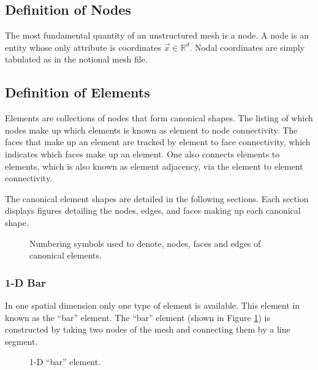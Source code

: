 \documentclass[letterpaper]{article}
\newcommand{\figref}[1]{Figure \ref{#1}}                %
\begin{document}
\subsection{Definition of Nodes}
The most fundamental quantity of an unstructured mesh is a node.  A node is an entity whose only attribute is coordinates $\vec{x} \in \mathbb{R}^{d}$.  Nodal coordinates are simply tabulated as in the notional mesh file.  
\subsection{Definition of Elements}
Elements are collections of nodes that form canonical shapes.  The listing of which nodes make up which elements is known as element to node connectivity.  The faces that make up an element are tracked by element to face connectivity, which indicates which faces make up an element.  One also connects elements to elements, which is also known as element adjacency, via the element to element connectivity.      

The  canonical element shapes are detailed in the following sections.  Each section displays figures detailing the nodes, edges, and faces making up each canonical shape.  
\begin{figure}[h!]
\centering
{}
\caption{Numbering symbols used to denote, nodes, faces and edges of canonical elements.}
\end{figure}
          
 \subsubsection{1-D Bar}
In one spatial dimension only one type of element is available.  This element in known as the ``bar'' element.  The ``bar'' element (shown in \figref{fig:c3_line}) is constructed by taking two nodes of the mesh and connecting them by a line segment.  
\begin{figure}[h!]
\centering
{}
\caption{1-D ``bar'' element.}
\label{fig:c3_line}
\end{figure}
\end{document}
